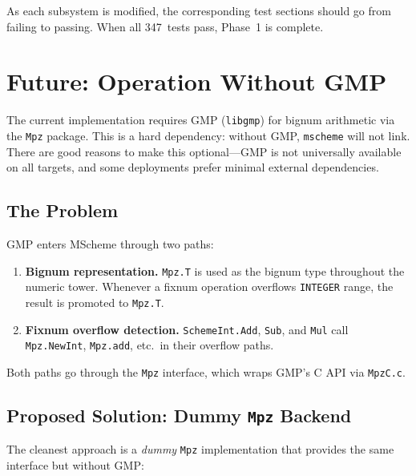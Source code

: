 \documentclass[12pt]{article}
\begin{document}
\noindent As each subsystem is modified, the corresponding test
sections should go from failing to passing.  When all 347~tests
pass, Phase~1 is complete.

\section{Future: Operation Without GMP}
\label{sec:no-gmp}

The current implementation requires GMP ({\tt libgmp}) for bignum
arithmetic via the {\tt Mpz} package.  This is a hard dependency:
without GMP, {\tt mscheme} will not link.  There are good reasons
to make this optional---GMP is not universally available on all
targets, and some deployments prefer minimal external dependencies.

\subsection{The Problem}

GMP enters MScheme through two paths:
\begin{enumerate}[nosep]
\item \textbf{Bignum representation.}  {\tt Mpz.T} is used as the
  bignum type throughout the numeric tower.  Whenever a fixnum
  operation overflows {\tt INTEGER} range, the result is promoted
  to {\tt Mpz.T}.
\item \textbf{Fixnum overflow detection.}  {\tt SchemeInt.Add},
  {\tt Sub}, and {\tt Mul} call {\tt Mpz.NewInt}, {\tt Mpz.add},
  etc.\ in their overflow paths.
\end{enumerate}

\noindent Both paths go through the {\tt Mpz} interface, which
wraps GMP's C API via {\tt MpzC.c}.

\subsection{Proposed Solution: Dummy {\tt Mpz} Backend}

The cleanest approach is a \emph{dummy} {\tt Mpz} implementation
that provides the same interface but without GMP:
\end{document}

